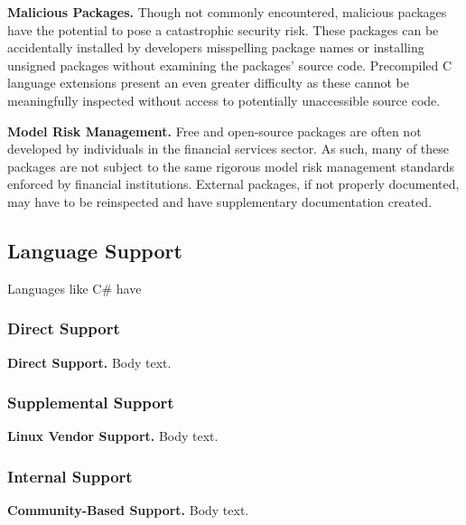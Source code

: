                 \textbf{Malicious Packages.}
                Though not commonly encountered, malicious packages have the potential to pose a catastrophic security risk. These packages can be accidentally installed by developers misspelling package names or installing unsigned packages without examining the packages' source code. Precompiled C language extensions present an even greater difficulty as these cannot be meaningfully inspected without access to potentially unaccessible source code.

                \textbf{Model Risk Management.}
                Free and open-source packages are often not developed by individuals in the financial services sector. As such, many of these packages are not subject to the same rigorous model risk management standards enforced by financial institutions. External packages, if not properly documented, may have to be reinspected and have supplementary documentation created.

        \subsection{Language Support}

            Languages like C\# have

            \subsubsection{Direct Support}

                \textbf{Direct Support.}
                Body text.

            \subsubsection{Supplemental Support}

                \textbf{Linux Vendor Support.}
                Body text.

            \subsubsection{Internal Support}
                            
                \textbf{Community-Based Support.}
                Body text.
